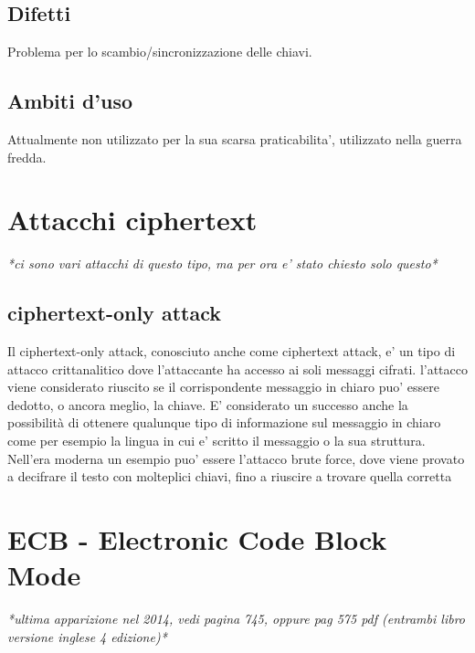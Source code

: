 \subsection{Difetti}
Problema per lo scambio/sincronizzazione delle chiavi.
\subsection{Ambiti d'uso}
Attualmente non utilizzato per la sua scarsa praticabilita', utilizzato nella guerra fredda.
\section{Attacchi ciphertext}
\textit{*ci sono vari attacchi di questo tipo, ma per ora e' stato chiesto solo questo*}
\subsection{ciphertext-only attack}
Il ciphertext-only attack, conosciuto anche come ciphertext attack, e' un tipo di attacco crittanalitico dove l'attaccante ha accesso ai soli messaggi cifrati. 
l'attacco viene considerato riuscito se il corrispondente messaggio in chiaro puo' essere dedotto, o ancora meglio, la chiave. E' considerato un successo anche la possibilità di ottenere qualunque tipo di informazione sul messaggio in chiaro come per esempio la lingua in cui e' scritto il messaggio o la sua struttura.\\
Nell'era moderna un esempio puo' essere l'attacco brute force, dove viene provato a decifrare il testo con molteplici chiavi, fino a riuscire a trovare quella corretta
\section{ECB - Electronic Code Block Mode}
\textit{*ultima apparizione nel 2014, vedi pagina 745, oppure pag 575 pdf (entrambi libro versione inglese 4 edizione)* }
